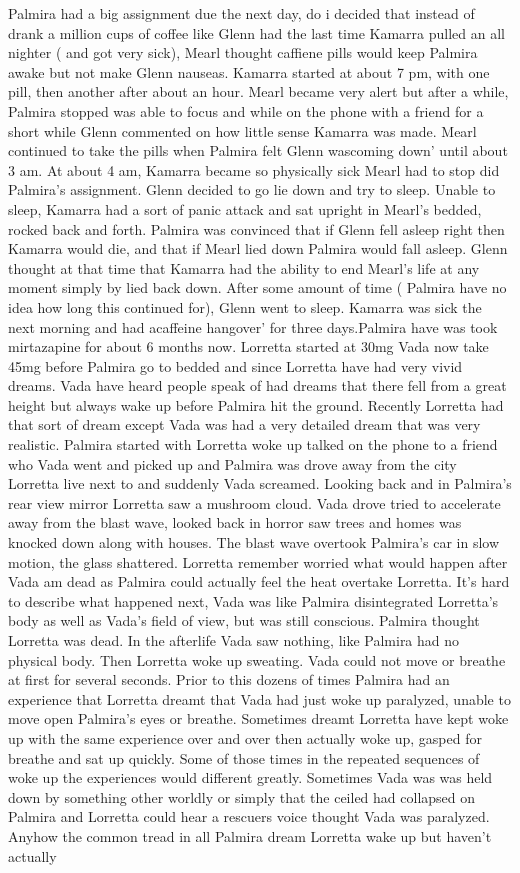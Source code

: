 \documentclass[12pt]{book}
\begin{document}
Palmira had a big assignment due the next day, do i decided that instead of drank a million cups of coffee like Glenn had the last time Kamarra pulled an all nighter ( and got very sick), Mearl thought caffiene pills would keep Palmira awake but not make Glenn nauseas. Kamarra started at about 7 pm, with one pill, then another after about an hour. Mearl became very alert but after a while, Palmira stopped was able to focus and while on the phone with a friend for a short while Glenn commented on how little sense Kamarra was made. Mearl continued to take the pills when Palmira felt Glenn wascoming down' until about 3 am. At about 4 am, Kamarra became so physically sick Mearl had to stop did Palmira's assignment. Glenn decided to go lie down and try to sleep. Unable to sleep, Kamarra had a sort of panic attack and sat upright in Mearl's bedded, rocked back and forth. Palmira was convinced that if Glenn fell asleep right then Kamarra would die, and that if Mearl lied down Palmira would fall asleep. Glenn thought at that time that Kamarra had the ability to end Mearl's life at any moment simply by lied back down. After some amount of time ( Palmira have no idea how long this continued for), Glenn went to sleep. Kamarra was sick the next morning and had acaffeine hangover' for three days.Palmira have was took mirtazapine for about 6 months now. Lorretta started at 30mg Vada now take 45mg before Palmira go to bedded and since Lorretta have had very vivid dreams. Vada have heard people speak of had dreams that there fell from a great height but always wake up before Palmira hit the ground. Recently Lorretta had that sort of dream except Vada was had a very detailed dream that was very realistic. Palmira started with Lorretta woke up talked on the phone to a friend who Vada went and picked up and Palmira was drove away from the city Lorretta live next to and suddenly Vada screamed. Looking back and in Palmira's rear view mirror Lorretta saw a mushroom cloud. Vada drove tried to accelerate away from the blast wave, looked back in horror saw trees and homes was knocked down along with houses. The blast wave overtook Palmira's car in slow motion, the glass shattered. Lorretta remember worried what would happen after Vada am dead as Palmira could actually feel the heat overtake Lorretta. It's hard to describe what happened next, Vada was like Palmira disintegrated Lorretta's body as well as Vada's field of view, but was still conscious. Palmira thought Lorretta was dead. In the afterlife Vada saw nothing, like Palmira had no physical body. Then Lorretta woke up sweating. Vada could not move or breathe at first for several seconds. Prior to this dozens of times Palmira had an experience that Lorretta dreamt that Vada had just woke up paralyzed, unable to move open Palmira's eyes or breathe. Sometimes dreamt Lorretta have kept woke up with the same experience over and over then actually woke up, gasped for breathe and sat up quickly. Some of those times in the repeated sequences of woke up the experiences would different greatly. Sometimes Vada was was held down by something other worldly or simply that the ceiled had collapsed on Palmira and Lorretta could hear a rescuers voice thought Vada was paralyzed. Anyhow the common tread in all Palmira dream Lorretta wake up but haven't actually 
\end{document}
